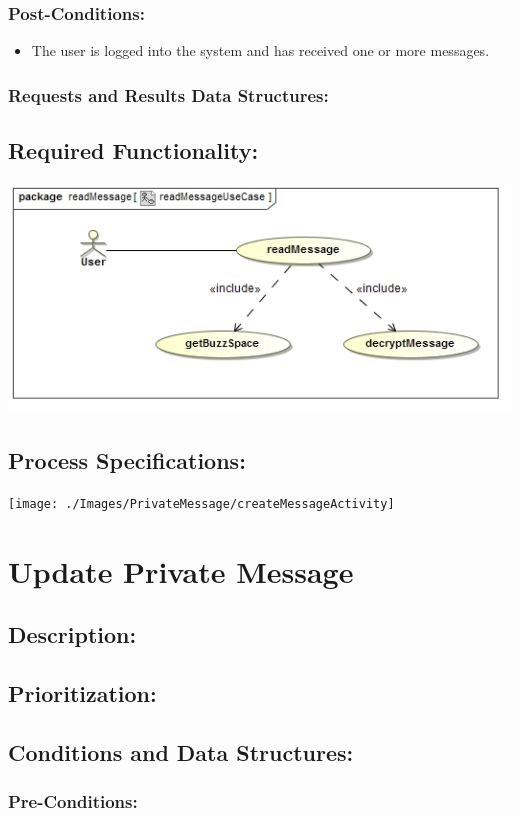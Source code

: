 \documentclass[a4paper,11pt]{article}
\begin{document}
\subsubsection*{Post-Conditions:}
\begin{itemize}
\item The user is logged into the system and has received one or more messages.
\end{itemize}
\subsubsection*{Requests and Results Data Structures:}
\subsection{Required Functionality:} 
\includegraphics[width=1\linewidth]{./Images/PrivateMessage/readMessageUseCase}
\subsection{Process Specifications:} 
\texttt{[image: ./Images/PrivateMessage/createMessageActivity]}

\section{Update Private Message}
\subsection*{Description:}
\subsection{Prioritization:} 
\subsection{Conditions and Data Structures:}
\subsubsection*{Pre-Conditions:}
\end{document}
